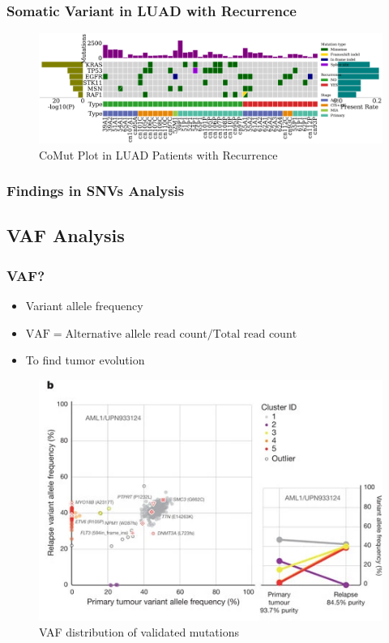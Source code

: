 \documentclass{beamer}
\begin{document}
    \begin{frame}
        \frametitle{Somatic Variant in LUAD with Recurrence}

        \begin{figure}
            \includegraphics[width=\linewidth]{figures/Mutect2/BWA-ADC.Recur.pdf}
            \caption{CoMut Plot in LUAD Patients with Recurrence}
        \end{figure}
    \end{frame}

    \begin{frame}
        \frametitle{Findings in SNVs Analysis}
    \end{frame}

    \subsection{VAF Analysis}
    \begin{frame}
        \frametitle{VAF?}

        \begin{itemize}
            \item Variant allele frequency
            \item $\textrm{VAF} = \textrm{Alternative allele read count} / \textrm{Total read count}$
            \item To find tumor evolution
        \end{itemize}

        \begin{figure}
            \includegraphics[width=0.4 \linewidth]{figures/VAF/VAF.jpg}
            \caption{VAF distribution of validated mutations \protect\cite{VAF1}}
        \end{figure}
    \end{frame}
\end{document}
